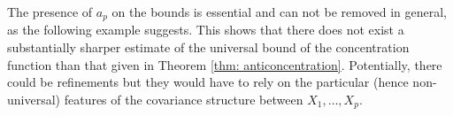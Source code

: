 \documentclass[11pt,reqno]{amsart}
\theoremstyle{definition}
\newtheorem{remark}{Comment}
\newcommand{\LL}{ \mathcal{L}}
\renewcommand{\Pr}{{\mathrm{P}}}
\newcommand{\RR}{\mathbb{R}}
\begin{document}

The presence of $a_{p}$ on the bounds is essential and can not be removed in general, as the following example suggests.
This shows that there does not exist a substantially sharper estimate of the universal bound of the concentration function than that given in Theorem \ref{thm: anticoncentration}.
Potentially, there could be refinements but they would have to rely on the particular (hence
non-universal) features of the covariance structure between $X_{1},\dots,X_{p}$.
\end{document}
